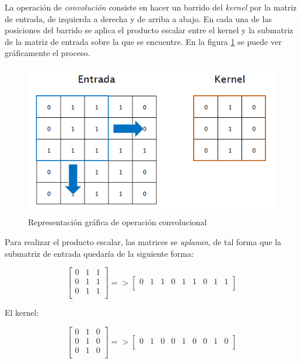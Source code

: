 La operación de \textit{convolución} consiste en hacer un barrido del \textit{kernel} por la matriz de entrada, de izquierda a derecha y de arriba a abajo. En cada una de las posiciones del barrido se aplica el producto escalar entre el kernel y la submatriz de la matriz de entrada sobre la que se encuentre. En la figura \ref{fig:cnn_convolutionoperationex} se puede ver gráficamente el proceso.

\begin{figure}[H]
	\centering
	\includegraphics[width=0.7\linewidth]{images/convolutional_operation_example.png}
	\caption{Representación gráfica de operación convolucional}
	\label{fig:cnn_convolutionoperationex}
\end{figure}

Para realizar el producto escalar, las matrices se \textit{aplanan}, de tal forma que la submatriz de entrada quedaría de la siguiente forma:

\begin{equation}
	\left[
	\begin{array}{ccc}
		0 & 1 & 1 \\
		0 & 1 & 1 \\
		0 & 1 & 1 \\
	\end{array}
	\right]
	=>
	\left[
	\begin{array}{ccccccccc}
		0 & 1 & 1 & 0 & 1 & 1 & 0 & 1 & 1 \\
	\end{array}
	\right]
	\nonumber
\end{equation}

El kernel:

\begin{equation}
	\left[
	\begin{array}{ccc}
		0 & 1 & 0 \\
		0 & 1 & 0 \\
		0 & 1 & 0 \\
	\end{array}
	\right]
	=>
	\left[
	\begin{array}{ccccccccc}
		0 & 1 & 0 & 0 & 1 & 0 & 0 & 1 & 0 \\
	\end{array}
	\right]
	\nonumber
\end{equation}

